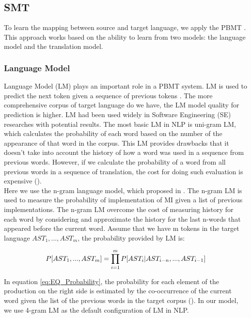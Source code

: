 
\subsection{SMT}
To learn the mapping between source and target language, we apply the PBMT \cite{Green2014}. This approach works based on the ability to learn from two models: the language model and the translation model.
\subsubsection{Language Model}
Language Model (LM) plays an important role in a PBMT system. LM is used to predict the next token given a sequence of previous tokens \cite{Koehn:2003:SPT:1073445.1073462}. The more comprehensive corpus of target language do we have, the LM model quality for prediction is higher. LM had been used widely in Software Engineering (SE) researches \cite{Hindle:2012:NS:2337223.2337322,Hel:7180076,Liu:7883371} with potential results. The most basic LM in NLP is uni-gram LM, which calculates the probability of each word based on the number of the appearance of that word in the corpus. This LM provides drawbacks that it doesn't take into account the history of how a word was used in a sequence from previous words. However, if we calculate the probability of a word from all previous words in a sequence of translation, the cost for doing such evaluation is expensive (\cite{Jurafsky:2009:SLP:1214993}). 
\\
Here we use the n-gram language model, which proposed in \cite{Jurafsky:2009:SLP:1214993}. The n-gram LM is used to measure the probability of implementation of MI given a list of previous implementations. The n-gram LM overcome the cost of measuring history for each word by considering and approximate the history for the last n-words that appeared before the current word. Assume that we have m tokens in the target language \({AST_{1},...,AST_{m}}\), the probability provided by LM is:

\begin{equation} 
\tiny
\label{eq:EQ_Probability}
 P[AST_{1}, ...,AST_{m}]=\prod_{i=1}^{m}P[AST_{i} | AST_{i-n},...,AST_{i-1}]
\end{equation}

In equation \ref{eq:EQ_Probability}, the probability for each element of the production on the right side is estimated by the co-occurrence of the current word given the list of the previous words in the target corpus (\cite{Jurafsky:2009:SLP:1214993}). In our model, we use 4-gram LM as the default configuration of LM in NLP.

